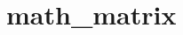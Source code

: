 \chapter{math\+\_\+matrix}
\hypertarget{md__r_e_a_d_m_e}{}\label{md__r_e_a_d_m_e}
\label{md__r_e_a_d_m_e_autotoc_md0}%
%
